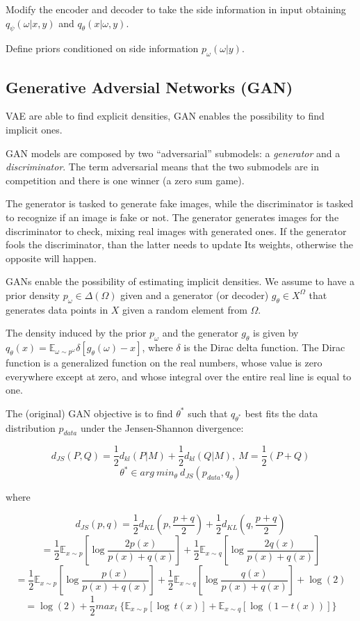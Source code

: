 \documentclass[11pt]{article}
\begin{document}
Modify the encoder and decoder to take the side information in input
obtaining \(q_{\psi}(\omega | x, y)\) and \(q_{\theta}(x|\omega, y)\).

Define priors conditioned on side information \(p_{\omega}(\omega |y)\).

\subsection{Generative Adversial Networks
(GAN)}\label{generative-adversial-networks-gan}

VAE are able to find explicit densities, GAN enables the possibility to
find implicit ones.

GAN models are composed by two ``adversarial'' submodels: a
\emph{generator} and a \emph{discriminator}. The term adversarial means
that the two submodels are in competition and there is one winner (a
zero sum game).

The generator is tasked to generate fake images, while the discriminator
is tasked to recognize if an image is fake or not. The generator
generates images for the discriminator to check, mixing real images with
generated ones. If the generator fools the discriminator, than the
latter needs to update Its weights, otherwise the opposite will happen.

GANs enable the possibility of estimating implicit densities. We assume
to have a prior density \(p_\omega \in \Delta (\Omega)\) given and a
generator (or decoder) \(g_\theta \in X^{\Omega}\) that generates data
points in \(X\) given a random element from \(\Omega\).

The density induced by the prior \(p_{\omega}\) and the generator
\(g_{\theta}\) is given by
\(q_{\theta}(x)=\mathbb{E}_{\omega \sim p^{\omega}}\delta [g_\theta (\omega)-x]\),
where \(\delta\) is the Dirac delta function. The Dirac function is a
generalized function on the real numbers, whose value is zero everywhere
except at zero, and whose integral over the entire real line is equal to
one.

The (original) GAN objective is to find \(\theta^*\) such that
\(q_{\theta^*}\) best fits the data distribution \(p_{data}\) under the
Jensen-Shannon divergence:

\[d_{JS}(P, Q)=\frac{1}{2}d_{kl}(P|M)+\frac{1}{2}d_{kl}(Q|M),\ M=\frac{1}{2}(P+Q)\]
\[\theta^* \in arg\ min_{\theta}\ d_{JS}(p_{data}, q_{\theta})\]

where

\[d_{JS}(p, q)=\frac{1}{2}d_{KL}(p, \frac{p+q}{2})+\frac{1}{2}d_{KL}(q, \frac{p+q}{2})\]
\[=\frac{1}{2}\mathbb{E}_{x\sim p}[\log\frac{2p(x)}{p(x)+q(x)}]+\frac{1}{2}\mathbb{E}_{x\sim q}[\log\frac{2q(x)}{p(x)+q(x)}]\]
\[=\frac{1}{2}\mathbb{E}_{x\sim p}[\log\frac{p(x)}{p(x)+q(x)}]+\frac{1}{2}\mathbb{E}_{x\sim q}[\log\frac{q(x)}{p(x)+q(x)}] + \log(2)\]
\[=\log(2)+\frac{1}{2}max_t\ \{ \mathbb{E}_{x\sim p}[\log\ t(x)] + \mathbb{E}_{x\sim q}[\log(1-t(x))] \}\]
\end{document}
